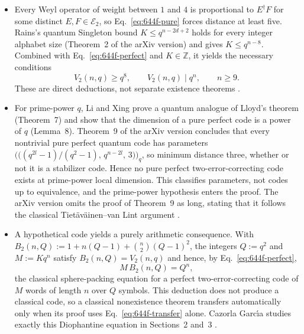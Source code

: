 \begin{itemize}
  \item Every Weyl operator of weight between $1$ and $4$ is proportional to
  $E^\dagger F$ for some distinct $E,F\in\mathcal E_2$, so
  Eq.~\eqref{eq:644f-pure} forces distance at least five.  Rains's quantum
  Singleton bound $K\leq q^{n-2d+2}$ holds for every integer alphabet size
  (Theorem~2 of the arXiv version) and gives $K\leq q^{n-8}$.  Combined with
  Eq.~\eqref{eq:644f-perfect} and $K\in\mathbb Z$, it yields the necessary
  conditions
  \begin{equation}
    V_2(n,q)\geq q^8,\qquad V_2(n,q)\mid q^n,\qquad n\geq 9 .
    \label{eq:644f-necessary}
  \end{equation}
  These are direct deductions, not separate existence theorems
  .

  \item For prime-power $q$, Li and Xing prove a quantum analogue of Lloyd's theorem
  (Theorem~7) and show that the dimension of a pure perfect code is a power of
  $q$ (Lemma~8).  Theorem~9 of the arXiv version concludes that every
  nontrivial pure perfect quantum code has parameters
  $\bigl(\bigl((q^{2l}-1)/(q^2-1),\,q^{n-2l},\,3\bigr)\bigr)_q$, so minimum
  distance three, whether or not it is a stabilizer code.  Hence no pure perfect
  two-error-correcting code exists at prime-power local dimension.  This
  classifies parameters, not codes up to equivalence, and the prime-power
  hypothesis enters the proof.  The arXiv version omits the proof of Theorem~9
  as long, stating that it follows the classical Tiet\"av\"ainen--van Lint
  argument .

  \item A hypothetical code yields a purely arithmetic consequence.  With
  $B_2(n,Q):=1+n(Q-1)+\binom n2(Q-1)^2$, the integers $Q:=q^2$ and $M:=Kq^n$
  satisfy $B_2(n,Q)=V_2(n,q)$ and hence, by Eq.~\eqref{eq:644f-perfect},
  \begin{equation}
    M\,B_2(n,Q)=Q^n ,
    \label{eq:644f-transfer}
  \end{equation}
  the classical sphere-packing equation for a perfect two-error-correcting code
  of $M$ words of length $n$ over $Q$ symbols.  This deduction does not produce a
  classical code, so a classical nonexistence theorem transfers automatically
  only when its proof uses Eq.~\eqref{eq:644f-transfer} alone.  Cazorla Garc\'{\i}a studies
  exactly this Diophantine equation in Sections~2 and~3
  .


\end{itemize}
